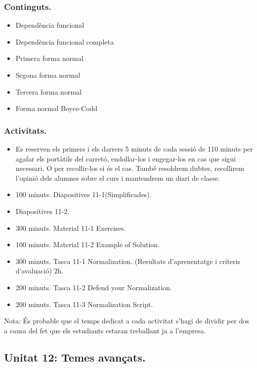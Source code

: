 \documentclass[catalan, a4paper, 12pt, titlepage]{article}
\begin{document}
  \subsubsection{Continguts.}
  \begin{itemize}
	\item Dependència funcional
	\item Dependència funcional completa
	\item Primera forma normal
	\item Segona forma normal
	\item Tercera forma normal
	\item Forma normal Boyce-Codd
  \end{itemize}

  \subsubsection{Activitats.}
  \begin{itemize}
          \item Es reserven els primers i els darrers 5 minuts de cada sessió de 110 minuts per agafar els portàtils del carretó, endollar-los i engegar-los en cas que sigui necessari. O per recollir-los si és el cas. També resoldrem dubtes, recollirem l'opinió dels alumnes sobre el curs i mantendrem un diari de classe.
	  \item 100 minuts. Diapositives 11-1(Simplificades).
	  \item Diapositives 11-2.
	  \item 300 minuts. Material 11-1 Exercises.
	  \item 100 minuts. Material 11-2 Example of Solution.
	  \item 300 minuts. Tasca 11-1 Normalization. (\faGraduationCap Resultats d'aprenentatge i criteris d'avaluació) 2h.
	  \item 200 minuts. Tasca 11-2 Defend your Normalization.
	  \item 200 minuts. Tasca 11-3 Normalization Script.
  \end{itemize}


  Nota: És probable que el temps dedicat a cada activitat s'hagi de dividir per dos a causa del fet que els estudiants estaran treballant ja a l'empresa.

  \subsection{Unitat 12: Temes avançats.}
\end{document}
